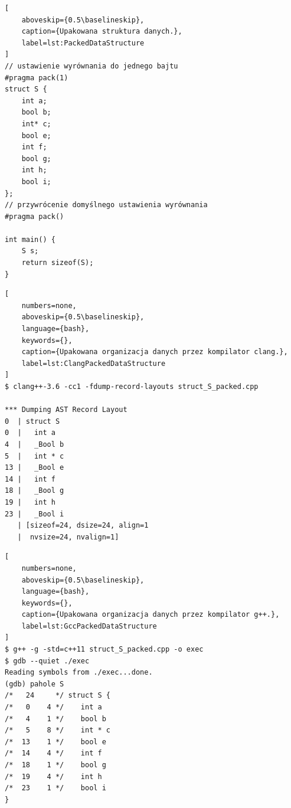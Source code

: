\begin{lstlisting}[
    aboveskip={0.5\baselineskip},
    caption={Upakowana struktura danych.},
    label=lst:PackedDataStructure
]
// ustawienie wyrównania do jednego bajtu
#pragma pack(1)
struct S {
    int a;
    bool b;
    int* c;
    bool e;
    int f;
    bool g;
    int h;
    bool i;
};
// przywrócenie domyślnego ustawienia wyrównania
#pragma pack()

int main() {
    S s;
    return sizeof(S);
}
\end{lstlisting}

\begin{lstlisting}[
    numbers=none,
    aboveskip={0.5\baselineskip},
    language={bash},
    keywords={},
    caption={Upakowana organizacja danych przez kompilator clang.},
    label=lst:ClangPackedDataStructure
]
$ clang++-3.6 -cc1 -fdump-record-layouts struct_S_packed.cpp

*** Dumping AST Record Layout
0  | struct S
0  |   int a
4  |   _Bool b
5  |   int * c
13 |   _Bool e
14 |   int f
18 |   _Bool g
19 |   int h
23 |   _Bool i
   | [sizeof=24, dsize=24, align=1
   |  nvsize=24, nvalign=1]
\end{lstlisting}
\clearpage %
\begin{lstlisting}[
    numbers=none,
    aboveskip={0.5\baselineskip},
    language={bash},
    keywords={},
    caption={Upakowana organizacja danych przez kompilator g++.},
    label=lst:GccPackedDataStructure
]
$ g++ -g -std=c++11 struct_S_packed.cpp -o exec
$ gdb --quiet ./exec
Reading symbols from ./exec...done.
(gdb) pahole S
/*   24     */ struct S {
/*   0    4 */    int a
/*   4    1 */    bool b
/*   5    8 */    int * c
/*  13    1 */    bool e
/*  14    4 */    int f
/*  18    1 */    bool g
/*  19    4 */    int h
/*  23    1 */    bool i
}
\end{lstlisting}
